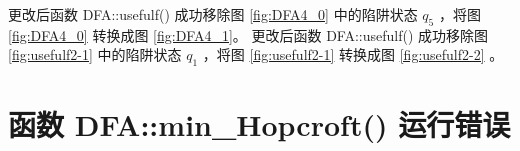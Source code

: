 更改后函数 DFA::usefulf() 成功移除图 \ref{fig:DFA4_0} 中的陷阱状态 $q_5$ ，将图 \ref{fig:DFA4_0} 转换成图 \ref{fig:DFA4_1}。
更改后函数 DFA::usefulf() 成功移除图 \ref{fig:usefulf2-1} 中的陷阱状态 $q_1$ ，将图 \ref{fig:usefulf2-1} 转换成图 \ref{fig:usefulf2-2} 。



\section{函数 DFA::min\_Hopcroft() 运行错误}\label{sec:hopcroft}

